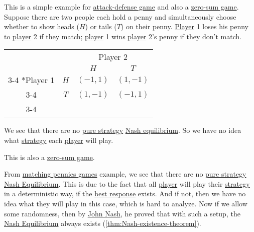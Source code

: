 \begin{eg}\label{eg:matching-pennies}
	This is a simple example for \hyperref[def:attach-defense-game]{attack-defense game} and also a \hyperref[def:zero-sum-game]{zero-sum game}. Suppose there are two people each hold a penny and simultaneously choose  whether to show heads (\(H\)) or tails (\(T\)) on their penny. \hyperref[def:player]{Player} 1 loses his penny to \hyperref[def:player]{player} 2 if they match; \hyperref[def:player]{player} 1 wins \hyperref[def:player]{player} 2's penny if they don't match.
	\begin{table}[H]
		\centering
		\setlength{\extrarowheight}{2pt}
		\begin{tabular}{cc|c|c|}
			                        & \multicolumn{1}{c}{} & \multicolumn{2}{c}{Player 2}                           \\
			                        & \multicolumn{1}{c}{} & \multicolumn{1}{c}{$H$}      & \multicolumn{1}{c}{$T$} \\\cline{3-4}
			\multirow{2}*{Player 1} & $H$                  & $(-1, 1)$                    & $(1, -1)$               \\\cline{3-4}
			                        & $T$                  & $(1, -1)$                    & $(-1, 1)$               \\\cline{3-4}
		\end{tabular}
	\end{table}
	We see that there are no \hyperref[def:pure-strategy]{pure strategy} \hyperref[def:Nash-equilibrium]{Nash equilibrium}. So we have no idea what
	\hyperref[def:strategy]{strategy} each \hyperref[def:player]{player} will play.
	\begin{remark}
		This is also a \hyperref[def:zero-sum-game]{zero-sum game}.
	\end{remark}
\end{eg}

\begin{remark}
	From \hyperref[eg:matching-pennies]{matching pennies games} example, we see that there are no \hyperref[def:pure-strategy]{pure strategy} \hyperref[def:Nash-equilibrium]{Nash Equilibrium}. This is due to the fact that all \hyperref[def:player]{player} will play their \hyperref[def:strategy]{strategy} in a deterministic way, if the \hyperref[def:best-response]{best response} exists. And if not, then we have no idea what they will play in this case, which is hard to analyze. Now if we allow some randomness, then by \href{https://en.wikipedia.org/wiki/John_Forbes_Nash_Jr.}{John Nash}, he proved that with such a setup, the \hyperref[def:Nash-equilibrium]{Nash Equilibrium} always exists (\autoref{thm:Nash-existence-theorem}).
\end{remark}

